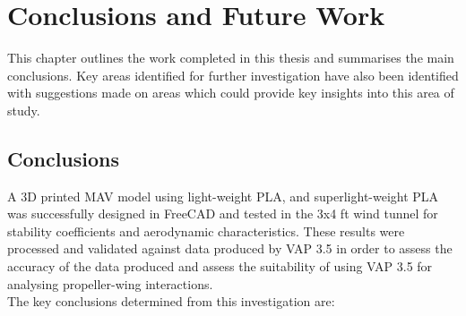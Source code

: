 \graphicspath{{./Figs/}}

\chapter{Conclusions and Future Work} 
This chapter outlines the work completed in this thesis and summarises the main conclusions. Key areas identified for further investigation have also been identified with suggestions made on areas which could provide key insights into this area of study. 
\section{Conclusions}

A 3D printed MAV model using light-weight PLA, and superlight-weight PLA was successfully designed in FreeCAD and tested in the 3x4 ft wind tunnel for stability coefficients and aerodynamic characteristics. These results were processed and validated against data produced by VAP 3.5 in order to assess the accuracy of the data produced and assess the suitability of using VAP 3.5 for analysing propeller-wing interactions.\\

The key conclusions determined from this investigation are:


